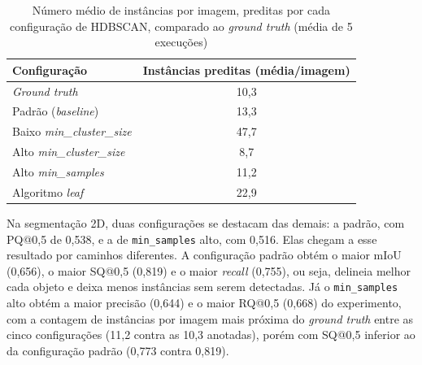 \begin{table}[h]
\centering
\caption{Métricas de segmentação de instância 2D para cada configuração do HDBSCAN (IoU $\geq 0{,}5$; média de 5 execuções)}
\label{tab:metricas_2d_experimento1}
\end{table}

\begin{table}[h]
\centering
\caption{Número médio de instâncias por imagem, preditas por cada configuração de HDBSCAN, comparado ao \textit{ground truth} (média de 5 execuções)}
\label{tab:instancias_experimento1}
\begin{tabular}{lc}
\hline
\textbf{Configuração} & \textbf{Instâncias preditas (média/imagem)} \\
\hline
\textit{Ground truth} & 10{,}3 \\
\hline
Padrão (\textit{baseline}) & 13{,}3 \\
Baixo \textit{min\_cluster\_size} & 47{,}7 \\
Alto \textit{min\_cluster\_size} & 8{,}7 \\
Alto \textit{min\_samples} & 11{,}2 \\
Algoritmo \textit{leaf} & 22{,}9 \\
\hline
\end{tabular}
\end{table}

Na segmentação 2D, duas configurações se destacam das demais: a padrão, com PQ@0,5 de 0,538, e a de \texttt{min\_samples} alto, com 0,516. Elas chegam a esse resultado por caminhos diferentes. A configuração padrão obtém o maior mIoU (0,656), o maior SQ@0,5 (0,819) e o maior \textit{recall} (0,755), ou seja, delineia melhor cada objeto e deixa menos instâncias sem serem detectadas. Já o \texttt{min\_samples} alto obtém a maior precisão (0,644) e o maior RQ@0,5 (0,668) do experimento, com a contagem de instâncias por imagem mais próxima do \textit{ground truth} entre as cinco configurações (11,2 contra as 10,3 anotadas), porém com SQ@0,5 inferior ao da configuração padrão (0,773 contra 0,819).

